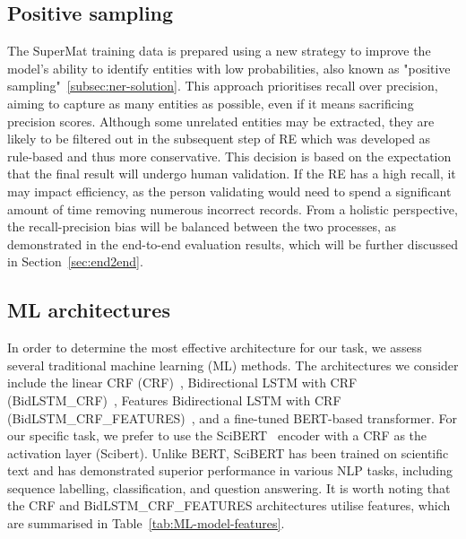 \subsection{Positive sampling}
The SuperMat training data is prepared using a new strategy to improve the model's ability to identify entities with low probabilities, also known as "positive sampling"~\ref{subsec:ner-solution}. 
This approach prioritises recall over precision, aiming to capture as many entities as possible, even if it means sacrificing precision scores. 
Although some unrelated entities may be extracted, they are likely to be filtered out in the subsequent step of RE which was developed as rule-based and thus more conservative. 
This decision is based on the expectation that the final result will undergo human validation. If the RE has a high recall, it may impact efficiency, as the person validating would need to spend a significant amount of time removing numerous incorrect records. 
From a holistic perspective, the recall-precision bias will be balanced between the two processes, as demonstrated in the end-to-end evaluation results, which will be further discussed in Section~\ref{sec:end2end}.

\subsection{ML architectures}
In order to determine the most effective architecture for our task, we assess several traditional machine learning (ML) methods. The architectures we consider include the linear CRF (CRF)~\cite{lafferty2001conditional}, Bidirectional LSTM with CRF (BidLSTM\_CRF)~\cite{lample2016neural}, Features Bidirectional LSTM with CRF (BidLSTM\_CRF\_FEATURES)~\cite{lample2016neural}, and a fine-tuned BERT-based transformer. For our specific task, we prefer to use the SciBERT~\cite{Beltagy2019SciBERT} encoder with a CRF as the activation layer (Scibert). Unlike BERT, SciBERT has been trained on scientific text and has demonstrated superior performance in various NLP tasks, including sequence labelling, classification, and question answering. It is worth noting that the CRF and BidLSTM\_CRF\_FEATURES architectures utilise features, which are summarised in Table~\ref{tab:ML-model-features}.


